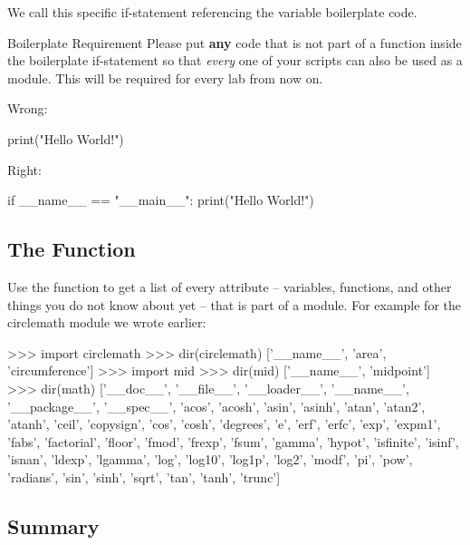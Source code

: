 \documentclass[11pt]{cselabheader}
\begin{document}
{

We call this specific if-statement referencing the 
variable boilerplate code.

\begin{infobox}{Boilerplate Requirement}
  Please put \textbf{any} code that is not part of a function inside the
  boilerplate if-statement so that \emph{every} one of your scripts can also be
  used as a module. This will be required for every lab from now on.

  Wrong:

  \begin{python3code}
print("Hello World!")
  \end{python3code}

  Right:

  \begin{python3code}
if __name__ == "__main__":
    print("Hello World!")
  \end{python3code}
\end{infobox}

\subsection{The \protect{} Function}

Use the  function to get a list of every attribute --
variables, functions, and other things you do not know about yet -- that is part
of a module. For example for the circlemath module we wrote earlier:

\begin{pyconcode}
>>> import circlemath
>>> dir(circlemath)
['__name__', 'area', 'circumference']
>>> import mid
>>> dir(mid)
['__name__', 'midpoint']
>>> dir(math)
['__doc__', '__file__', '__loader__', '__name__', '__package__', '__spec__', 'acos',
'acosh', 'asin', 'asinh', 'atan', 'atan2', 'atanh', 'ceil', 'copysign', 'cos', 'cosh',
'degrees', 'e', 'erf', 'erfc', 'exp', 'expm1', 'fabs', 'factorial', 'floor', 'fmod',
'frexp', 'fsum', 'gamma', 'hypot', 'isfinite', 'isinf', 'isnan', 'ldexp', 'lgamma',
'log', 'log10', 'log1p', 'log2', 'modf', 'pi', 'pow', 'radians', 'sin', 'sinh', 'sqrt',
'tan', 'tanh', 'trunc']
\end{pyconcode}

\subsection{Summary}
\label{subsec:modules.sum}

}
\end{document}
